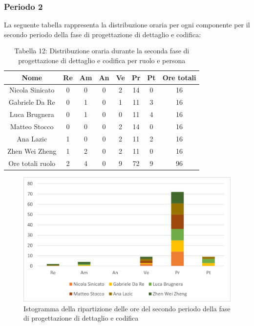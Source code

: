 \subsubsection{Periodo 2}
%
La seguente tabella rappresenta la distribuzione oraria per ogni componente per il secondo periodo della fase di progettazione di dettaglio e codifica:
\begin{table}[h]
	\setlength\extrarowheight{5pt}
	\centering
	\begin{tabularx}{\textwidth}{|ccccccc|c|}
		\hline
		\rowcolor{white}
		\textbf{Nome} & \textbf{Re} & \textbf{Am} & \textbf{An} & \textbf{Ve} & \textbf{Pr}& \textbf{Pt} & \textbf{Ore totali} \\
		\hline
		Nicola Sinicato &0&0&0&2&14&0&16 \\
		Gabriele Da Re &0&1&0&1&11&3&16 \\
		Luca Brugnera &0&1&0&0&11&4&16 \\
		Matteo Stocco &0&0&0&2&14&0&16 \\
		Ana Lazic &1&0&0&2&11&2&16 \\
		Zhen Wei Zheng &1&2&0&2&11&0&16 \\
		\hline
		Ore totali ruolo &2&4&0&9&72&9&96 \\
		\hline
	\end{tabularx}
	\vspace{10pt}
	\caption{Tabella 12: Distribuzione oraria durante la seconda fase di progettazione di dettaglio e codifica per ruolo e persona}
\end{table}
\begin{figure}[H]
    \centering
    \includegraphics[scale=0.6]{img/grafi preventivo/istogrammi/codifica/periodo2.png}
    \caption{Istogramma della ripartizione delle ore del secondo periodo della fase di progettazione di dettaglio e codifica}
\end{figure}
